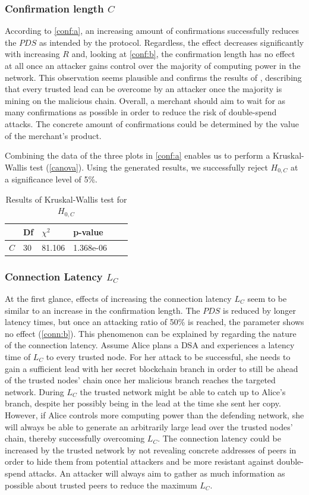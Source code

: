 \documentclass[a4paper,12pt,twoside]{report}
\begin{document}
\subsubsection{Confirmation length $C$} \label{consdisc}
According to \autoref{conf:a}, an increasing amount of confirmations successfully reduces the $PDS$ as intended by the protocol. Regardless, the effect decreases significantly with increasing $R$ and, looking at \autoref{conf:b}, the confirmation length has no effect at all once an attacker gains control over the majority of computing power in the network. This observation seems plausible and confirms the results of \cite{nakamoto2008bitcoin,HBDSA}, describing that every trusted lead can be overcome by an attacker once the majority is mining on the malicious chain. Overall, a merchant should aim to wait for as many confirmations as possible in order to reduce the risk of double-spend attacks. The concrete amount of confirmations could be determined by the value of the merchant's product.

Combining the data of the three plots in \autoref{conf:a} enables us to perform a Kruskal-Wallis test (\autoref{canova}). Using the generated results, we successfully reject $H_{0,C}$ at a significance level of 5\%.
\begin{table}[hb]
\centering
\begin{tabular}{|l|l|l|l|l|l|} \hline
& Df & $\chi^{2}$ & p-value \\ \hline
$C$ & 30 & 81.106 & 1.368e-06 \\ \hline
\end{tabular}
\caption{Results of Kruskal-Wallis test for $H_{0,C}$}
\label{canova}
\end{table}
\subsubsection{Connection Latency $L_C$} \label{connlatsec}
At the first glance, effects of increasing the connection latency $L_C$ seem to be similar to an increase in the confirmation length. The $PDS$ is reduced by longer latency times, but once an attacking ratio of 50\% is reached, the parameter shows no effect (\autoref{conn:b}). This phenomenon can be explained by regarding the nature of the connection latency. Assume Alice plans a DSA and experiences a latency time of $L_C$ to every trusted node. For her attack to be successful, she needs to gain a sufficient lead with her secret blockchain branch in order to still be ahead of the trusted nodes' chain once her malicious branch reaches the targeted network. During $L_C$ the trusted network might be able to catch up to Alice's branch, despite her possibly being in the lead at the time she sent her copy. However, if Alice controls more computing power than the defending network, she will always be able to generate an arbitrarily large lead over the trusted nodes' chain, thereby successfully overcoming $L_C$. The connection latency could be increased by the trusted network by not revealing concrete addresses of peers in order to hide them from potential attackers and be more resistant against double-spend attacks. An attacker will always aim to gather as much information as possible about trusted peers to reduce the maximum $L_C$.
\end{document}
